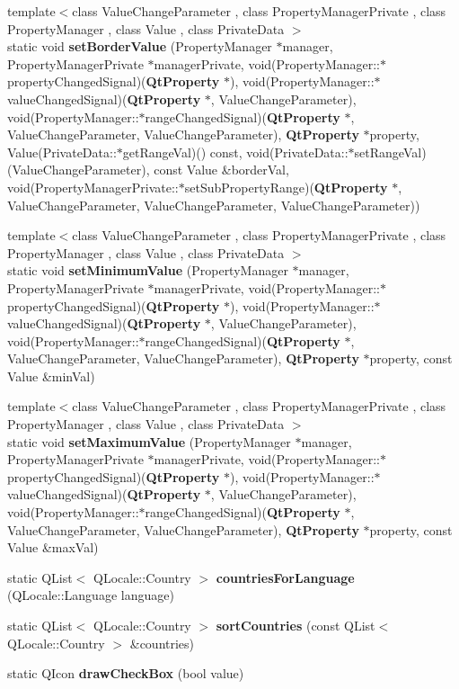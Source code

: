 \begin{DoxyCompactItemize}
\item 
{\footnotesize template$<$class Value\+Change\+Parameter , class Property\+Manager\+Private , class Property\+Manager , class Value , class Private\+Data $>$ }\\static void {\bf set\+Border\+Value} (Property\+Manager $\ast$manager, Property\+Manager\+Private $\ast$manager\+Private, void(Property\+Manager\+::$\ast$property\+Changed\+Signal)({\bf Qt\+Property} $\ast$), void(Property\+Manager\+::$\ast$value\+Changed\+Signal)({\bf Qt\+Property} $\ast$, Value\+Change\+Parameter), void(Property\+Manager\+::$\ast$range\+Changed\+Signal)({\bf Qt\+Property} $\ast$, Value\+Change\+Parameter, Value\+Change\+Parameter), {\bf Qt\+Property} $\ast$property, Value(Private\+Data\+::$\ast$get\+Range\+Val)() const, void(Private\+Data\+::$\ast$set\+Range\+Val)(Value\+Change\+Parameter), const Value \&border\+Val, void(Property\+Manager\+Private\+::$\ast$set\+Sub\+Property\+Range)({\bf Qt\+Property} $\ast$,                                                                       Value\+Change\+Parameter, Value\+Change\+Parameter, Value\+Change\+Parameter))
\item 
{\footnotesize template$<$class Value\+Change\+Parameter , class Property\+Manager\+Private , class Property\+Manager , class Value , class Private\+Data $>$ }\\static void {\bf set\+Minimum\+Value} (Property\+Manager $\ast$manager, Property\+Manager\+Private $\ast$manager\+Private, void(Property\+Manager\+::$\ast$property\+Changed\+Signal)({\bf Qt\+Property} $\ast$), void(Property\+Manager\+::$\ast$value\+Changed\+Signal)({\bf Qt\+Property} $\ast$, Value\+Change\+Parameter), void(Property\+Manager\+::$\ast$range\+Changed\+Signal)({\bf Qt\+Property} $\ast$, Value\+Change\+Parameter, Value\+Change\+Parameter), {\bf Qt\+Property} $\ast$property, const Value \&min\+Val)
\item 
{\footnotesize template$<$class Value\+Change\+Parameter , class Property\+Manager\+Private , class Property\+Manager , class Value , class Private\+Data $>$ }\\static void {\bf set\+Maximum\+Value} (Property\+Manager $\ast$manager, Property\+Manager\+Private $\ast$manager\+Private, void(Property\+Manager\+::$\ast$property\+Changed\+Signal)({\bf Qt\+Property} $\ast$), void(Property\+Manager\+::$\ast$value\+Changed\+Signal)({\bf Qt\+Property} $\ast$, Value\+Change\+Parameter), void(Property\+Manager\+::$\ast$range\+Changed\+Signal)({\bf Qt\+Property} $\ast$, Value\+Change\+Parameter, Value\+Change\+Parameter), {\bf Qt\+Property} $\ast$property, const Value \&max\+Val)
\item 
static Q\+List$<$ Q\+Locale\+::\+Country $>$ {\bf countries\+For\+Language} (Q\+Locale\+::\+Language language)
\item 
static Q\+List$<$ Q\+Locale\+::\+Country $>$ {\bf sort\+Countries} (const Q\+List$<$ Q\+Locale\+::\+Country $>$ \&countries)
\item 
static Q\+Icon {\bf draw\+Check\+Box} (bool value)
\end{DoxyCompactItemize}


